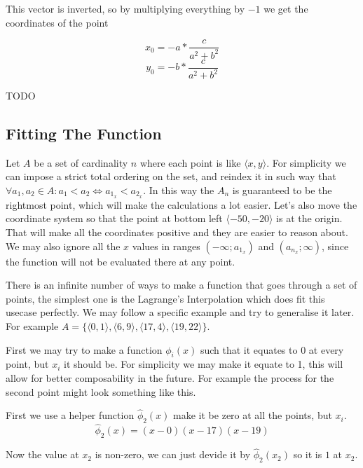 \documentclass[12pt, titlepage]{article}
\newcommand{\TODO}{\begin{center}\color{red}TODO\end{center}}
\begin{document}
This vector is inverted, so by multiplying everything by $-1$ we get the coordinates
of the point

\begin{equation}
    x_0 = -a * \frac{c}{a^2 + b^2}
\end{equation}
\begin{equation}
    y_0 = -b * \frac{c}{a^2 + b^2}
\end{equation}

\TODO

\subsection{Fitting The Function}
Let $A$ be a set of cardinality $n$ where each point is like $\langle x, y \rangle$.
For simplicity we can impose a strict total ordering on the set, and reindex
it in such way that $\forall a_1,a_2 \in A : a_1 < a_2 \Leftrightarrow a_{1_x} < 
a_{2_x}$. In this way the $A_n$ is guaranteed to be the rightmost point, which
will make the calculations a lot easier. Let's also move the coordinate system
so that the point at bottom left $\langle -50, -20 \rangle$ is at the origin.
That will make all the coordinates positive and they are easier to reason about.
We may also ignore all the $x$ values in ranges 
$(-\infty; a_{1_x})$ and $(a_{n_x}; \infty)$, since the function will not be 
evaluated there at any point.

There is an infinite number of ways to make a function that goes through a set of
points, the simplest one is the Lagrange's Interpolation which does fit this 
usecase perfectly. We may follow a specific example and try to generalise it later. 
For example $A = \{\langle 0, 1 \rangle, \langle 6, 9 \rangle, 
\langle 17, 4 \rangle, \langle 19, 22 \rangle\}$.

First we may try to make a function $\phi_i(x)$ such that it equates to 0 at
every point, but $x_i$ it should be. For simplicity we may make it equate to 1, this will
allow for better composability in the future. For example the process for the second point
might look something like this.

First we use a helper function $\hat{\phi}_2(x)$ make it be zero at all the points, but $x_i$.
\begin{equation}
    \hat{\phi}_2(x) = (x - 0)(x - 17)(x - 19)
\end{equation}

Now the value at $x_2$ is non-zero, we can just devide it by $\hat{\phi}_2(x_2)$ 
so it is $1$ at $x_2$.
\end{document}
